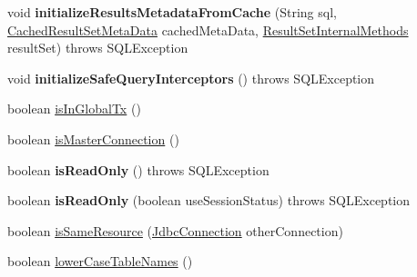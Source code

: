 \begin{DoxyCompactItemize}
\item 
\mbox{\label{classcom_1_1mysql_1_1cj_1_1jdbc_1_1ha_1_1_multi_host_my_s_q_l_connection_a410fa65fc66b0e6e92c54adad9afc601}} 
void {\bfseries initialize\+Results\+Metadata\+From\+Cache} (String sql, \mbox{\hyperlink{interfacecom_1_1mysql_1_1cj_1_1jdbc_1_1result_1_1_cached_result_set_meta_data}{Cached\+Result\+Set\+Meta\+Data}} cached\+Meta\+Data, \mbox{\hyperlink{interfacecom_1_1mysql_1_1cj_1_1jdbc_1_1result_1_1_result_set_internal_methods}{Result\+Set\+Internal\+Methods}} result\+Set)  throws S\+Q\+L\+Exception 
\item 
\mbox{\label{classcom_1_1mysql_1_1cj_1_1jdbc_1_1ha_1_1_multi_host_my_s_q_l_connection_a0e3142ef146b788ca33dd4d80c56dd21}} 
void {\bfseries initialize\+Safe\+Query\+Interceptors} ()  throws S\+Q\+L\+Exception 
\item 
boolean \mbox{\hyperlink{classcom_1_1mysql_1_1cj_1_1jdbc_1_1ha_1_1_multi_host_my_s_q_l_connection_a12a895a23d45e4ac2df69fed6c022fef}{is\+In\+Global\+Tx}} ()
\item 
boolean \mbox{\hyperlink{classcom_1_1mysql_1_1cj_1_1jdbc_1_1ha_1_1_multi_host_my_s_q_l_connection_a0c1fb78db80d2aedf2d8aa89ff182b5a}{is\+Master\+Connection}} ()
\item 
\mbox{\label{classcom_1_1mysql_1_1cj_1_1jdbc_1_1ha_1_1_multi_host_my_s_q_l_connection_abe5fbbc469276ab5bb4b1cea4eb1cfee}} 
boolean {\bfseries is\+Read\+Only} ()  throws S\+Q\+L\+Exception 
\item 
\mbox{\label{classcom_1_1mysql_1_1cj_1_1jdbc_1_1ha_1_1_multi_host_my_s_q_l_connection_a8d98f787c6394382daeda85369d080ee}} 
boolean {\bfseries is\+Read\+Only} (boolean use\+Session\+Status)  throws S\+Q\+L\+Exception 
\item 
boolean \mbox{\hyperlink{classcom_1_1mysql_1_1cj_1_1jdbc_1_1ha_1_1_multi_host_my_s_q_l_connection_a47d81e605bf65122771ecb727b6177ed}{is\+Same\+Resource}} (\mbox{\hyperlink{interfacecom_1_1mysql_1_1cj_1_1jdbc_1_1_jdbc_connection}{Jdbc\+Connection}} other\+Connection)
\item 
boolean \mbox{\hyperlink{classcom_1_1mysql_1_1cj_1_1jdbc_1_1ha_1_1_multi_host_my_s_q_l_connection_a5a3250cfcbd628ed09ce0eb494a1ff20}{lower\+Case\+Table\+Names}} ()

\end{DoxyCompactItemize}
